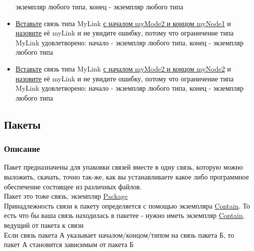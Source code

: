 \documentclass{article}
\begin{document}
\begin{itemize}
            экземпляр
            любого типа, конец - экземпляр любого типа
      \item \hyperlink{DeepCase.InsertLink.Description}{Вставьте} связь типа
            MyLink
            \hyperlink{FAQ.HowToInsertLinkWithFromAndTo}{с началом myMode2 и
                  концом
                  myNode1} и \hyperlink{FAQ.HowToSetName}{назовите} её myLink и
            не
            увидите
            ошибку, потому что ограничение типа MyLink удовлетворено: начало -
            экземпляр
            любого типа, конец - экземпляр любого типа
      \item \hyperlink{DeepCase.InsertLink.Description}{Вставьте} связь типа
            MyLink
            \hyperlink{FAQ.HowToInsertLinkWithFromAndTo}{с началом myMode2 и
                  концом
                  myNode2} и \hyperlink{FAQ.HowToSetName}{назовите} её myLink и
            не
            увидите
            ошибку, потому что ограничение типа MyLink удовлетворено: начало -
            экземпляр
            любого типа, конец - экземпляр любого типа
\end{itemize}
\subsection{Пакеты}
\subsubsection{Описание}
Пакет предназначены для упаковки связей вместе в одну связь, которую можно
выложить, скачать, точно так-же, как вы устанавливаете какое либо программное
обеспечение состоящее из различных файлов. \\
Пакет это тоже связь, экземпляр \hyperlink{Core.Package}{Package} \\
Принадлежность связи к пакету определяется с помощью экземпляра
\hyperlink{Core.Contain.Description}{Contain}. То есть что бы ваша связь
находилась в
пакетее - нужно иметь экземпляр \hyperlink{Core.Contain.Description}{Contain},
ведущий
от пакета к связи \\
Если связь пакета А указывает началом/концом/типом на связь пакета Б, то пакет
А становится зависимым от пакета Б \\
\end{document}
